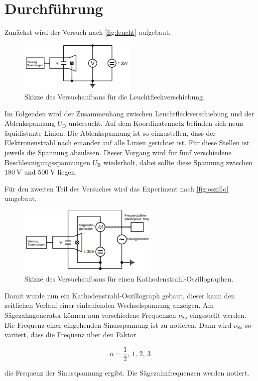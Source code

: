 \section{Durchführung}
\label{sec:Durchführung}


Zunächst wird der Versuch nach \autoref{fig:leucht} aufgebaut.

\begin{figure}
    \centering
    \includegraphics[width=0.5\textwidth]{images/bild3.png}
    \caption{Skizze des Versuchaufbaus für die Leuchtfleckverschiebung.}
    \label{fig:leucht}
\end{figure}

Im Folgenden wird der Zusammenhang zwischen Leuchtfleckverschiebung und der Ablenkspannung $U_\text{D}$ untersucht.
Auf dem Koordinatennetz befinden sich neun äquidistante Linien.
Die Ablenkspannung ist so einzustellen, dass der Elektronenstrahl nach einander auf alle Linien gerichtet ist.
Für diese Stellen ist jeweils die Spannung abzulesen.
Dieser Vorgang wird für fünf verschiedene Beschleunigungsspannungen $U_\text{B}$ wiederholt, dabei sollte diese Spannung zwischen $\SI{180}{\volt}$ und $\SI{500}{\volt}$ liegen.

Für den zweiten Teil des Versuches wird das Experiment nach \autoref{fig:oszillo} umgebaut.

\begin{figure}
    \centering
    \includegraphics[width=0.6\textwidth]{images/bild4.png}
    \caption{Skizze des Versuchaufbaus für einen Kathodenstrahl-Oszillographen.}
    \label{fig:oszillo}
\end{figure}

Damit wurde nun ein Kathodenstrahl-Oszillograph gebaut, dieser kann den zeitlichen Verlauf einer einlaufenden Wechselspannung anzeigen.
Am Sägezahngenerator können nun verschiedene Frequenzen $\nu _\text{Sä}$ eingestellt werden.
Die Frequenz einer eingehenden Sinusspannung ist zu notieren.
Dann wird $\nu _\text{Sä}$ so variiert, dass die Frequenz über den Faktor  

\begin{equation}
    n = \frac{1}{2}, \, 1, \, 2, \, 3
\end{equation}

die Frequenz der Sinusspannung ergibt. 
Die Sägezahnfrequenzen werden notiert.